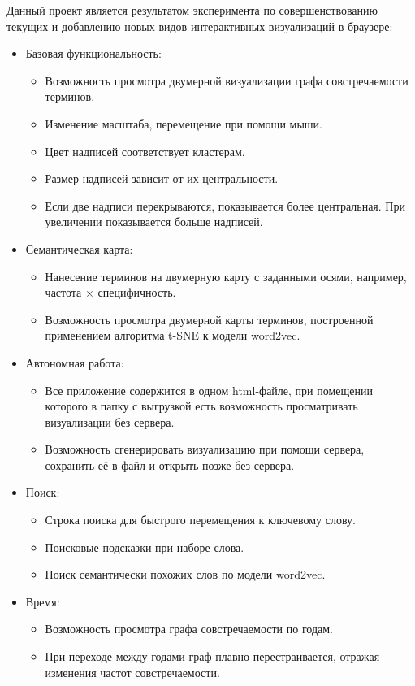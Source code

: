 Данный проект является результатом эксперимента по совершенствованию текущих и добавлению новых видов интерактивных визуализаций в браузере:
\begin{itemize}
\item Базовая функциональность:
  \begin{itemize}
  \item Возможность просмотра двумерной визуализации графа совстречаемости терминов.
  \item Изменение масштаба, перемещение при помощи мыши.
  \item Цвет надписей соответствует кластерам.
  \item Размер надписей зависит от их центральности.
  \item Если две надписи перекрываются, показывается более центральная. При увеличении показывается больше надписей.
  \end{itemize}

\item Семантическая карта:
  \begin{itemize}
  \item Нанесение терминов на двумерную карту с заданными осями, например, частота $\times$ специфичность.
  \item Возможность просмотра двумерной карты терминов, построенной применением алгоритма t-SNE к модели word2vec.
  \end{itemize}

\item Автономная работа:
  \begin{itemize}
  \item Все приложение содержится в одном html-файле, при помещении которого в папку с выгрузкой есть возможность просматривать визуализации без сервера.
  \item Возможность сгенерировать визуализацию при помощи сервера, сохранить её в файл и открыть позже без сервера.
  \end{itemize}

\item Поиск:
  \begin{itemize}
  \item Строка поиска для быстрого перемещения к ключевому слову.
  \item Поисковые подсказки при наборе слова.
  \item Поиск семантически похожих слов по модели word2vec.
  \end{itemize}

\item Время:
  \begin{itemize}
  \item Возможность просмотра графа совстречаемости по годам.
  \item При переходе между годами граф плавно перестраивается, отражая изменения частот совстречаемости.
  \end{itemize}


\end{itemize}
